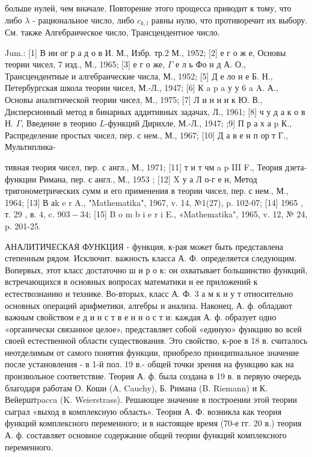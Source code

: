 \documentclass[10pt]{article}
\begin{document}
больше нулей, чем вначале. Повторение этого прощесса приводит к тому, что либо $\lambda$ - рациональное число, либо $c_{k, l}$ равны нулю, что противоречит их выбору. См. также Алгебраическое число, Трансцендентное число.



Jum.: [1] В ин ог р а д о в И. М., Избр. тр.2 М., 1952; [2] е г о ж е, Основы теории чисел, 7 изд., М., 1965; [3] е г о же, $\Gamma$ е л ь Фо н д А. О., Трансцендентные и алгебраические числа, М., 1952; [5] Д е ло н е Б. Н., Петербургская школа теории чисел, М.-Л., 1947; [6] К a p a у у 6 a A. А., Основы аналитической теории чисел, М., 1975; [7] Л и н н и к Ю. В., Дисперсионный метод в бинарных аддитивных задачах, Л., 1961; [8] ч у д а к о в Н. $\Gamma$, Введение в теорию $L$-функций Дирихле, М.-Л., 1947; ;9] П р а х а p К., Распределение простых чисел, пер. с нем., М., 1967; [10] Д а в е н п ор т Г., Мультиплика-

тивная теория чисел, пер. с англ., М., 1971; [11] т и т чм a p III F., Теория дзета-функции Римана, пер. с англ., М., 1953 ; [12] X у а Л о-г е н, Метод тригонометрических сумм и его применения в теории чисел, пер. с нем., М., 1964; [13] В аk e r A., "Mathematika", 1967, v. 14, №1(27), p. 102-07; [14] 1965 , т. 29 , в. 4, c. $903-34$; [15] B o m b i e r i E., «Mathematika", 1965, v. 12, № 24, p. 201-25.



АНАЛИТИЧЕСКАЯ ФУНКЦИЯ - функция, к-рая может быть представлена степенным рядом. Исключит. важность класса А. Ф. определяется следующим. Вопервых, этот класс достаточно ш и р о к: он охватывает большинство функций, встречающихся в основных вопросах математики и ее приложений к естествознанию и технике. Во-вторых, класс А. Ф. 3 а м к н у т относительно основных операций арифметики, алгебры и анализа. Наконец, А. ф. обладают важным свойством е д и н с т в е н н о с т и: каждая А. ф. образует одно «органически связанное целое», представляет собой «единую» функцию во всей своей естественной области существования. Это свойство, к-рое в 18 в. считалось неотделимым от самого понятия функции, приобрело принципиальное значение после установления - в 1-й пол. 19 в.- общей точки зрения на функцию как на произвольное соответствие. Теория А. ф. была создана в 19 в. в первую очередь благодаря работам О. Коши (A. Cauchy), Б. Римана (B. Riemann) и К. Вейерштpacca (K. Weierstrass). Решающее значение в построении этой теории сыграл «выход в комплексную область». Теория А. Ф. возникла как теория функций комплексного переменного; и в настоящее время (70-е гг. 20 в.) теория А. ф. составляет основное содержание общей теории функций комплексного переменного.
\end{document}
